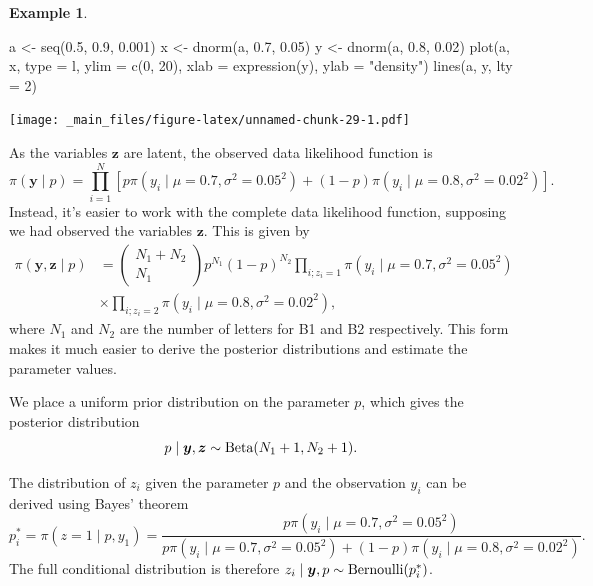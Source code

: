 \documentclass[
]{book}
\newenvironment{Shaded}{\begin{snugshade}}{\end{snugshade}}
\newcommand{\AttributeTok}[1]{\textcolor[rgb]{0.77,0.63,0.00}{#1}}
\newcommand{\DecValTok}[1]{\textcolor[rgb]{0.00,0.00,0.81}{#1}}
\newcommand{\FloatTok}[1]{\textcolor[rgb]{0.00,0.00,0.81}{#1}}
\newcommand{\FunctionTok}[1]{\textcolor[rgb]{0.00,0.00,0.00}{#1}}
\newcommand{\NormalTok}[1]{#1}
\newcommand{\OtherTok}[1]{\textcolor[rgb]{0.56,0.35,0.01}{#1}}
\newcommand{\StringTok}[1]{\textcolor[rgb]{0.31,0.60,0.02}{#1}}
\theoremstyle{definition}
\theoremstyle{definition}
\newtheorem{example}{Example}[chapter]
\theoremstyle{definition}
\theoremstyle{definition}
\theoremstyle{remark}
\begin{document}
\begin{example}
\begin{Shaded}
\begin{Highlighting}[]
\NormalTok{a }\OtherTok{\textless{}{-}} \FunctionTok{seq}\NormalTok{(}\FloatTok{0.5}\NormalTok{, }\FloatTok{0.9}\NormalTok{, }\FloatTok{0.001}\NormalTok{)}
\NormalTok{x }\OtherTok{\textless{}{-}} \FunctionTok{dnorm}\NormalTok{(a, }\FloatTok{0.7}\NormalTok{, }\FloatTok{0.05}\NormalTok{)}
\NormalTok{y }\OtherTok{\textless{}{-}} \FunctionTok{dnorm}\NormalTok{(a, }\FloatTok{0.8}\NormalTok{, }\FloatTok{0.02}\NormalTok{)}
\FunctionTok{plot}\NormalTok{(a, x, }\AttributeTok{type =} \StringTok{\textquotesingle{}l\textquotesingle{}}\NormalTok{, }\AttributeTok{ylim =} \FunctionTok{c}\NormalTok{(}\DecValTok{0}\NormalTok{, }\DecValTok{20}\NormalTok{), }\AttributeTok{xlab =} \FunctionTok{expression}\NormalTok{(y), }\AttributeTok{ylab =} \StringTok{"density"}\NormalTok{)}
\FunctionTok{lines}\NormalTok{(a, y, }\AttributeTok{lty =} \DecValTok{2}\NormalTok{)}
\end{Highlighting}
\end{Shaded}

\texttt{[image: \_main\_files/figure-latex/unnamed-chunk-29-1.pdf]}

As the variables \(\boldsymbol{z}\) are latent, the observed data likelihood function is
\[
\pi(\boldsymbol{y} \mid  p) =\prod_{i=1}^N \left[ p\pi(y_i \mid \mu = 0.7, \sigma^2 = 0.05^2) + (1-p)\pi(y_i \mid \mu = 0.8, \sigma^2 = 0.02^2)\right].
\]
Instead, it's easier to work with the complete data likelihood function, supposing we had observed the variables \(\boldsymbol{z}\). This is given by
\begin{align*}
\pi(\boldsymbol{y}, \boldsymbol{z} \mid  p) &= \begin{pmatrix} N_1 + N_2
\\ N_1\end{pmatrix}p^{N_1}(1-p)^{N_2} \prod_{i; z_i = 1}\pi(y_i \mid \mu = 0.7, \sigma^2 = 0.05^2)  \\
&\times\prod_{i; z_i = 2}\pi(y_i \mid \mu = 0.8, \sigma^2 = 0.02^2),
\end{align*}
where \(N_1\) and \(N_2\) are the number of letters for B1 and B2 respectively. This form makes it much easier to derive the posterior distributions and estimate the parameter values.

We place a uniform prior distribution on the parameter \(p\), which gives the posterior distribution
\[
p \mid \boldsymbol{y}, \boldsymbol{z} \sim \hbox{Beta}(N_1 + 1, N_2 + 1).
\]

The distribution of \(z_i\) given the parameter \(p\) and the observation \(y_i\) can be derived using Bayes' theorem
\[
p^*_i = \pi(z = 1 \mid p, y_1) = \frac{p\pi(y_i \mid \mu = 0.7, \sigma^2 = 0.05^2)}{p\pi(y_i \mid \mu = 0.7, \sigma^2 = 0.05^2) + (1-p)\pi(y_i \mid \mu = 0.8, \sigma^2 = 0.02^2)}.
\]
The full conditional distribution is therefore \(z_i \mid \boldsymbol{y}, p \sim \hbox{Bernoulli}(p^*_i)\).


\end{example}
\end{document}
